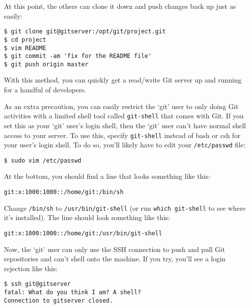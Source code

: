 \documentclass[a4paper]{book}
\begin{document}
At this point, the others can clone it down and push changes back up just as easily:

\begin{shaded}\begin{verbatim}
$ git clone git@gitserver:/opt/git/project.git
$ cd project
$ vim README
$ git commit -am 'fix for the README file'
$ git push origin master
\end{verbatim}\end{shaded}

With this method, you can quickly get a read/write Git server up and running for a handful of developers.

As an extra precaution, you can easily restrict the `git' user to only doing Git activities with a limited shell tool called \texttt{git-shell} that comes with Git. If you set this as your `git' user's login shell, then the `git' user can't have normal shell access to your server. To use this, specify \texttt{git-shell} instead of bash or csh for your user's login shell. To do so, you'll likely have to edit your \texttt{/etc/passwd} file:

\begin{shaded}\begin{verbatim}
$ sudo vim /etc/passwd
\end{verbatim}\end{shaded}

At the bottom, you should find a line that looks something like this:

\begin{shaded}\begin{verbatim}
git:x:1000:1000::/home/git:/bin/sh
\end{verbatim}\end{shaded}

Change \texttt{/bin/sh} to \texttt{/usr/bin/git-shell} (or run \texttt{which git-shell} to see where it's installed). The line should look something like this:

\begin{shaded}\begin{verbatim}
git:x:1000:1000::/home/git:/usr/bin/git-shell
\end{verbatim}\end{shaded}

Now, the `git' user can only use the SSH connection to push and pull Git repositories and can't shell onto the machine. If you try, you'll see a login rejection like this:

\begin{shaded}\begin{verbatim}
$ ssh git@gitserver
fatal: What do you think I am? A shell?
Connection to gitserver closed.
\end{verbatim}\end{shaded}
\end{document}
